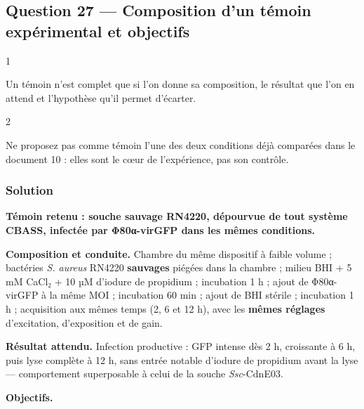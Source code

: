 \documentclass[11pt,a4paper]{article}
\begin{document}
\hypertarget{question-27-composition-dun-tuxe9moin-expuxe9rimental-et-objectifs}{%
\subsection{Question 27 --- Composition d'un témoin expérimental et objectifs}\label{question-27-composition-dun-tuxe9moin-expuxe9rimental-et-objectifs}}

\begin{indication}{1}

Un témoin n'est complet que si l'on donne sa composition, le résultat que l'on en attend et l'hypothèse qu'il permet d'écarter.

\end{indication}

\begin{indication}{2}

Ne proposez pas comme témoin l'une des deux conditions déjà comparées dans le document 10 : elles sont le cœur de l'expérience, pas son contrôle.

\end{indication}

\hypertarget{solution-26}{%
\subsubsection{Solution}\label{solution-26}}

\textbf{Témoin retenu : souche sauvage RN4220, dépourvue de tout système CBASS, infectée par Φ80α-virGFP dans les mêmes conditions.}

\textbf{Composition et conduite.} Chambre du même dispositif à faible volume ; bactéries \emph{S. aureus} RN4220 \textbf{sauvages} piégées dans la chambre ; milieu BHI + 5 mM CaCl₂ + 10 µM d'iodure de propidium ; incubation 1 h ; ajout de Φ80α-virGFP à la même MOI ; incubation 60 min ; ajout de BHI stérile ; incubation 1 h ; acquisition aux mêmes temps (2, 6 et 12 h), avec les \textbf{mêmes réglages} d'excitation, d'exposition et de gain.

\textbf{Résultat attendu.} Infection productive : GFP intense dès 2 h, croissante à 6 h, puis lyse complète à 12 h, sans entrée notable d'iodure de propidium avant la lyse --- comportement superposable à celui de la souche \emph{Ssc}-CdnE03.

\textbf{Objectifs.}
\end{document}

